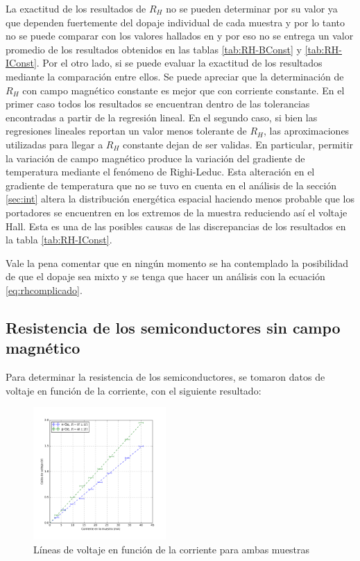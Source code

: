 \documentclass[twocolumn,showkeys,preprintnumbers,amsmath,amssymb]{revtex4}
\begin{document}
	La exactitud de los resultados de $R_H$ no se pueden determinar por su valor ya que dependen fuertemente del dopaje individual de cada muestra y por lo tanto no se puede comparar con los valores hallados en \cite{bib:soporteN} y por eso no se entrega un valor promedio de los resultados obtenidos en las tablas \ref{tab:RH-BConst} y \ref{tab:RH-IConst}. Por el otro lado, si se puede evaluar la exactitud de los resultados mediante la comparación entre ellos. Se puede apreciar que la determinación de $R_H$ con campo magnético constante es mejor que con corriente constante. En el primer caso todos los resultados se encuentran dentro de las tolerancias encontradas a partir de la regresión lineal. En el segundo caso, si bien las regresiones lineales reportan un valor menos tolerante de $R_H$, las aproximaciones utilizadas para llegar a $R_H$ constante dejan de ser validas. En particular, permitir la variación de campo magnético produce la variación del gradiente de temperatura mediante el fenómeno de Righi-Leduc. Esta alteración en el gradiente de temperatura que no se tuvo en cuenta en el análisis de la sección \ref{sec:int} altera la distribución energética espacial haciendo menos probable que los portadores se encuentren en los extremos de la muestra reduciendo así el voltaje Hall. Esta es una de las posibles causas de las discrepancias de los resultados en la tabla \ref{tab:RH-IConst}.
	
	Vale la pena comentar que en ningún momento se ha contemplado la posibilidad de que el dopaje sea mixto y se tenga que hacer un análisis con la ecuación \eqref{eq:rhcomplicado}.  		
		
	\subsection{Resistencia de los semiconductores sin campo magnético}
	
		Para determinar la resistencia de los semiconductores, se tomaron datos de voltaje en función de la corriente, con el siguiente resultado:
		
		\begin{figure}[H]
			\centering
			\includegraphics[width=0.45\textwidth]{RSinCampo.pdf}
			\caption{Líneas de voltaje en función de la corriente para ambas muestras}
			\label{fig:RSinCampo}
		\end{figure}
		
\end{document}
